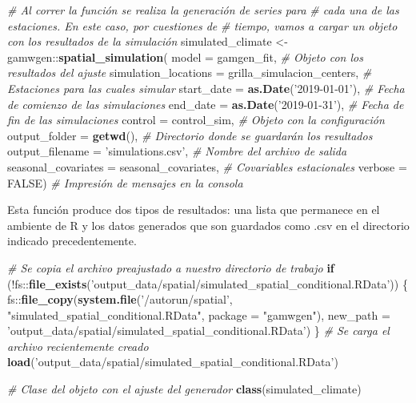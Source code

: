 \documentclass[
  12pt]{article}
\newenvironment{Shaded}{}{}
\newcommand{\CommentTok}[1]{\textcolor[rgb]{0.38,0.63,0.69}{\textit{#1}}}
\newcommand{\ControlFlowTok}[1]{\textcolor[rgb]{0.00,0.44,0.13}{\textbf{#1}}}
\newcommand{\DataTypeTok}[1]{\textcolor[rgb]{0.56,0.13,0.00}{#1}}
\newcommand{\KeywordTok}[1]{\textcolor[rgb]{0.00,0.44,0.13}{\textbf{#1}}}
\newcommand{\NormalTok}[1]{#1}
\newcommand{\OperatorTok}[1]{\textcolor[rgb]{0.40,0.40,0.40}{#1}}
\newcommand{\OtherTok}[1]{\textcolor[rgb]{0.00,0.44,0.13}{#1}}
\newcommand{\StringTok}[1]{\textcolor[rgb]{0.25,0.44,0.63}{#1}}
\begin{document}
\begin{Shaded}
\begin{Highlighting}[]
\CommentTok{# Al correr la función se realiza la generación de series para }
\CommentTok{# cada una de las estaciones. En este caso, por cuestiones de }
\CommentTok{# tiempo, vamos a cargar un objeto con los resultados de la simulación }
\NormalTok{simulated_climate <-}\StringTok{ }\NormalTok{gamwgen}\OperatorTok{::}\KeywordTok{spatial_simulation}\NormalTok{(}
  \DataTypeTok{model =}\NormalTok{ gamgen_fit, }
  \CommentTok{# Objeto con los resultados del ajuste}
  \DataTypeTok{simulation_locations =}\NormalTok{ grilla_simulacion_centers, }
  \CommentTok{# Estaciones para las cuales simular}
  \DataTypeTok{start_date =} \KeywordTok{as.Date}\NormalTok{(}\StringTok{'2019-01-01'}\NormalTok{), }
  \CommentTok{# Fecha de comienzo de las simulaciones}
  \DataTypeTok{end_date =} \KeywordTok{as.Date}\NormalTok{(}\StringTok{'2019-01-31'}\NormalTok{),}
  \CommentTok{# Fecha de fin de las simulaciones}
  \DataTypeTok{control =}\NormalTok{ control_sim, }
  \CommentTok{# Objeto con la configuración}
  \DataTypeTok{output_folder =} \KeywordTok{getwd}\NormalTok{(), }
  \CommentTok{# Directorio donde se guardarán los resultados}
  \DataTypeTok{output_filename =} \StringTok{'simulations.csv'}\NormalTok{, }
  \CommentTok{# Nombre del archivo de salida}
  \DataTypeTok{seasonal_covariates =}\NormalTok{ seasonal_covariates, }
  \CommentTok{# Covariables estacionales}
  \DataTypeTok{verbose =} \OtherTok{FALSE}\NormalTok{) }
\CommentTok{# Impresión de mensajes en la consola}
\end{Highlighting}
\end{Shaded}

Esta función produce dos tipos de resultados: una lista que permanece en el ambiente de R y los datos generados que son guardados como .csv en el directorio indicado precedentemente.

\begin{Shaded}
\begin{Highlighting}[]
\CommentTok{# Se copia el archivo preajustado a nuestro directorio de trabajo}
\ControlFlowTok{if}\NormalTok{ (}\OperatorTok{!}\NormalTok{fs}\OperatorTok{::}\KeywordTok{file_exists}\NormalTok{(}\StringTok{'output_data/spatial/simulated_spatial_conditional.RData'}\NormalTok{)) \{}
\NormalTok{  fs}\OperatorTok{::}\KeywordTok{file_copy}\NormalTok{(}\KeywordTok{system.file}\NormalTok{(}\StringTok{'/autorun/spatial'}\NormalTok{, }\StringTok{"simulated_spatial_conditional.RData"}\NormalTok{,  }\DataTypeTok{package =} \StringTok{"gamwgen"}\NormalTok{),}
                \DataTypeTok{new_path =} \StringTok{'output_data/spatial/simulated_spatial_conditional.RData'}\NormalTok{)}
\NormalTok{\}  }
\CommentTok{# Se carga el archivo recientemente creado}
\KeywordTok{load}\NormalTok{(}\StringTok{'output_data/spatial/simulated_spatial_conditional.RData'}\NormalTok{)}

\CommentTok{# Clase del objeto con el ajuste del generador}
\KeywordTok{class}\NormalTok{(simulated_climate)}
\end{Highlighting}
\end{Shaded}
\end{document}
